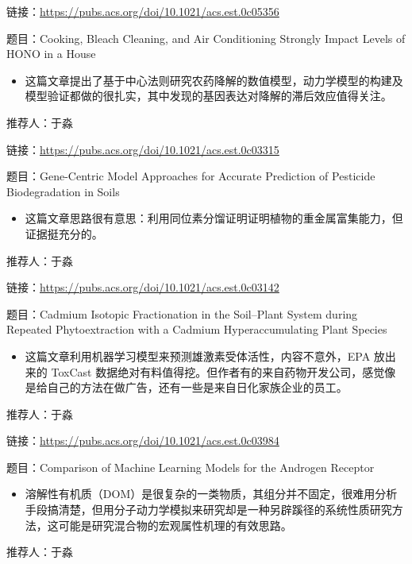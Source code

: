 \documentclass[
]{book}
\providecommand{\tightlist}{%
  \setlength{\itemsep}{0pt}\setlength{\parskip}{0pt}}
\begin{document}
链接：\url{https://pubs.acs.org/doi/10.1021/acs.est.0c05356}

题目：Cooking, Bleach Cleaning, and Air Conditioning Strongly Impact Levels of HONO in a House

\begin{itemize}
\tightlist
\item
  这篇文章提出了基于中心法则研究农药降解的数值模型，动力学模型的构建及模型验证都做的很扎实，其中发现的基因表达对降解的滞后效应值得关注。
\end{itemize}

推荐人：于淼

链接：\url{https://pubs.acs.org/doi/10.1021/acs.est.0c03315}

题目：Gene-Centric Model Approaches for Accurate Prediction of Pesticide Biodegradation in Soils

\begin{itemize}
\tightlist
\item
  这篇文章思路很有意思：利用同位素分馏证明证明植物的重金属富集能力，但证据挺充分的。
\end{itemize}

推荐人：于淼

链接：\url{https://pubs.acs.org/doi/10.1021/acs.est.0c03142}

题目：Cadmium Isotopic Fractionation in the Soil--Plant System during Repeated Phytoextraction with a Cadmium Hyperaccumulating Plant Species

\begin{itemize}
\tightlist
\item
  这篇文章利用机器学习模型来预测雄激素受体活性，内容不意外，EPA 放出来的 ToxCast 数据绝对有料值得挖。但作者有的来自药物开发公司，感觉像是给自己的方法在做广告，还有一些是来自日化家族企业的员工。
\end{itemize}

推荐人：于淼

链接：\url{https://pubs.acs.org/doi/10.1021/acs.est.0c03984}

题目：Comparison of Machine Learning Models for the Androgen Receptor

\begin{itemize}
\tightlist
\item
  溶解性有机质（DOM）是很复杂的一类物质，其组分并不固定，很难用分析手段搞清楚，但用分子动力学模拟来研究却是一种另辟蹊径的系统性质研究方法，这可能是研究混合物的宏观属性机理的有效思路。
\end{itemize}

推荐人：于淼
\end{document}
